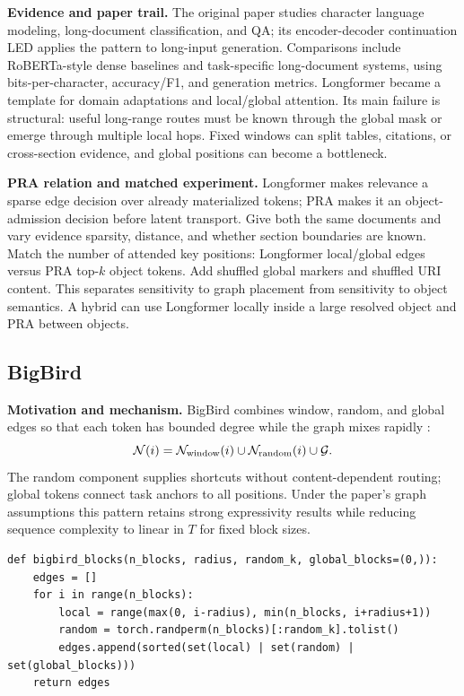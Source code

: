 \textbf{Evidence and paper trail.} The original paper studies character language modeling,
long-document classification, and QA; its encoder-decoder continuation LED applies the
pattern to long-input generation.  Comparisons include RoBERTa-style dense baselines and
task-specific long-document systems, using bits-per-character, accuracy/F1, and generation
metrics.  Longformer became a template for domain adaptations and local/global attention.
Its main failure is structural: useful long-range routes must be known through the global
mask or emerge through multiple local hops.  Fixed windows can split tables, citations,
or cross-section evidence, and global positions can become a bottleneck.

\textbf{PRA relation and matched experiment.} Longformer makes relevance a sparse edge
decision over already materialized tokens; PRA makes it an object-admission decision
before latent transport.  Give both the same documents and vary evidence sparsity,
distance, and whether section boundaries are known.  Match the number of attended key
positions: Longformer local/global edges versus PRA top-$k$ object tokens.  Add shuffled
global markers and shuffled URI content.  This separates sensitivity to graph placement
from sensitivity to object semantics.  A hybrid can use Longformer locally inside a large
resolved object and PRA between objects.

\subsection{BigBird}

\textbf{Motivation and mechanism.} BigBird combines window, random, and global edges so
that each token has bounded degree while the graph mixes rapidly
\citep{zaheer2020bigbird}:
\begin{equation}
\mathcal N(i)=\mathcal N_{\rm window}(i)\cup
\mathcal N_{\rm random}(i)\cup\mathcal G.
\end{equation}
The random component supplies shortcuts without content-dependent routing; global tokens
connect task anchors to all positions.  Under the paper's graph assumptions this pattern
retains strong expressivity results while reducing sequence complexity to linear in $T$
for fixed block sizes.

\begin{lstlisting}[caption={Block-level BigBird adjacency sketch}]
def bigbird_blocks(n_blocks, radius, random_k, global_blocks=(0,)):
    edges = []
    for i in range(n_blocks):
        local = range(max(0, i-radius), min(n_blocks, i+radius+1))
        random = torch.randperm(n_blocks)[:random_k].tolist()
        edges.append(sorted(set(local) | set(random) | set(global_blocks)))
    return edges
\end{lstlisting}


